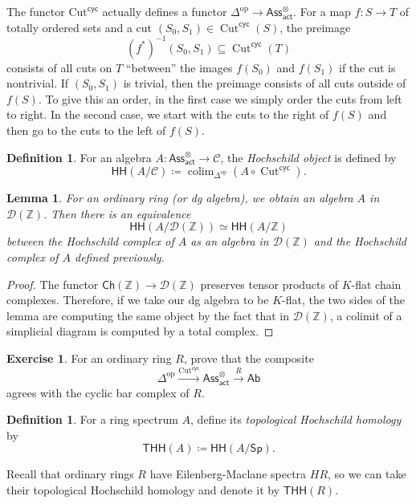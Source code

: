 \documentclass[10pt, oneside]{memoir}
\newtheorem{lem}[thm]{Lemma}
\theoremstyle{definition}
\newtheorem{defn}[thm]{Definition}
\newtheorem{exer}[thm]{Exercise}
\theoremstyle{remark}
\theoremstyle{plain}
\theoremstyle{definition}
\theoremstyle{remark}
\newcommand{\Z}{\mathbb{Z}}
\newcommand{\mc}[1]{\mathcal{#1}}
\newcommand{\mr}[1]{\mathrm{#1}}
\newcommand{\on}[1]{\operatorname{#1}}
\newcommand{\ms}[1]{\mathsf{#1}}
\newcommand{\1}{\mathbf{1}}
\newcommand{\2}{\mathbf{2}}
\newcommand{\3}{\mathbf{3}}
\newcommand{\THH}{\ms{THH}}
\newcommand{\HH}{\ms{HH}}
\DeclareMathOperator{\op}{op}
\DeclareMathOperator*{\colim}{colim}
\begin{document}
The functor $\mr{Cut}^{\ms{cyc}}$ actually defines a functor $\Delta^{\op} \to \ms{Ass}_{\ms{act}}^{\otimes}$. For a map $f \colon S \to T$ of totally ordered sets and a cut $(S_0, S_1) \in \on{Cut}^{\ms{cyc}}(S)$, the preimage
\[ (f^*)^{-1} (S_0, S_1) \subseteq \on{Cut}^{\ms{cyc}}(T) \]
consists of all cuts on $T$ ``between'' the images $f(S_0)$ and $f(S_1)$ if the cut is nontrivial. If $(S_0, S_1)$ is trivial, then the preimage consists of all cuts outside of $f(S)$. To give this an order, in the first case we simply order the cuts from left to right. In the second case, we start with the cuts to the right of $f(S)$ and then go to the cuts to the left of $f(S)$.

\begin{defn}
    For an algebra $A \colon \ms{Ass}_{\ms{act}}^{\otimes} \to \mc{C}$, the \textit{Hochschild object} is defined by
    \[ \HH(A/\mc{C}) \coloneqq \colim_{\Delta^{\op}} (A \circ \on{Cut}^{\ms{cyc}}). \]
\end{defn}

\begin{lem}
    For an ordinary ring (or dg algebra), we obtain an algebra $A$ in $\mc{D}(\Z)$. Then there is an equivalence
    \[ \HH(A/\mc{D}(\Z)) \simeq \HH(A/\Z) \]
    between the Hochschild complex of $A$ as an algebra in $\mc{D}(\Z)$ and the Hochschild complex of $A$ defined previously.
\end{lem}

\begin{proof}
    The functor $\ms{Ch}(\Z) \to \mc{D}(\Z)$ preserves tensor products of $K$-flat chain complexes. Therefore, if we take our dg algebra to be $K$-flat, the two sides of the lemma are computing the same object by the fact that in $\mc{D}(\Z)$, a colimit of a simplicial diagram is computed by a total complex.
\end{proof}

\begin{exer}
    For an ordinary ring $R$, prove that the composite
    \[ \Delta^{\op} \xrightarrow{\on{Cut}^{\ms{cyc}}} \ms{Ass}_{\ms{act}}^{\otimes} \xrightarrow{R} \ms{Ab} \]
    agrees with the cyclic bar complex of $R$.
\end{exer}

\begin{defn}
    For a ring spectrum $A$, define its \textit{topological Hochschild homology} by
    \[ \THH(A) \coloneqq \HH(A/\ms{Sp}). \]
\end{defn}

Recall that ordinary rings $R$ have Eilenberg-Maclane spectra $HR$, so we can take their topological Hochschild homology and denote it by $\THH(R)$.
\end{document}
